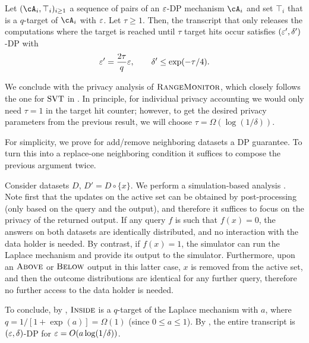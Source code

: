 \begin{theorem} \label{thm:TCT}
Let $(\cA_i,\top_i)_{i\geq 1}$ a sequence of pairs of an $\varepsilon$-DP mechanism $\cA_i$ and set $\top_i$ that is a $q$-target of $\cA_i$ with $\varepsilon$. Let $\tau\geq 1$.
Then, the transcript that only releases the computations where the target is reached until $\tau$ target hits occur satisfies $(\varepsilon',\delta')$-DP with 
\[\varepsilon'=\frac{2\tau}{q}\varepsilon,\qquad \delta'\leq \exp(-\tau/4).\]
\end{theorem}

We conclude with the privacy analysis of $\textsc{RangeMonitor}$, which closely follows the one  for $\mathrm{SVT}$ in \cite{Cohen:2023}. In principle, for individual privacy accounting we would only need $\tau=1$ in the target hit counter; however, to get the desired privacy parameters from the previous result, we will choose $\tau=\Omega(\log(1/\delta))$.

\begin{proofof}{}
For simplicity, we prove for add/remove neighboring datasets a DP guarantee. To turn this into a replace-one neighboring condition it suffices to compose the previous argument twice. 

Consider datasets $D$, $D'=D\circ\{x\}$. 
We perform a simulation-based analysis \citep{CohenSTOC:23,Cohen:2023}. Note first that the updates on the active set can be obtained by post-processing (only based on the query and the output), and therefore it suffices to focus on the privacy of the returned output. 
If any query $f$ is such that $f(x)=0$, the answers on both datasets are identically distributed, and no interaction with the data holder is needed. By contrast, if $f(x)=1$, the simulator can run the Laplace mechanism and provide its output to the simulator. 
Furthermore, upon an $\textsc{Above}$ or $\textsc{Below}$ output in this latter case, $x$ is removed from the active set, and then the outcome distributions are identical for any further query, therefore no further access to the data holder is needed. 

To conclude, by , $\textsc{Inside}$ is a $q$-target of the Laplace mechanism with $a$, where $q=1/[1+\exp(a)]=\Omega(1)$ (since $0\leq a\leq 1$). By , the entire transcript is $(\varepsilon,\delta)$-DP for $\varepsilon=O(a\log(1/\delta))$.
\end{proofof}


